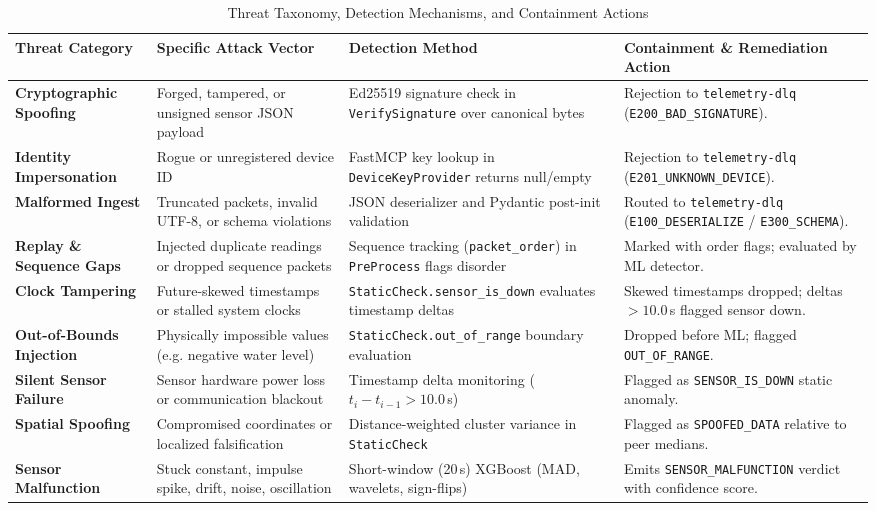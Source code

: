 \documentclass[11pt,a4paper]{article}
\begin{document}
\begin{table}[H]
\centering
\scriptsize
\renewcommand{\arraystretch}{0.98}
\caption{Threat Taxonomy, Detection Mechanisms, and Containment Actions}
\label{tab:threat_table}
\begin{tabularx}{\textwidth}{p{2.2cm}p{3.2cm}p{4.2cm}X}
\toprule
\textbf{Threat Category} & \textbf{Specific Attack Vector} & \textbf{Detection Method} & \textbf{Containment \& Remediation Action} \\
\midrule
\textbf{Cryptographic Spoofing} & Forged, tampered, or unsigned sensor JSON payload & Ed25519 signature check in \texttt{VerifySignature} over canonical bytes & Rejection to \texttt{telemetry-dlq} (\texttt{E200\_BAD\_SIGNATURE}). \\
\textbf{Identity Impersonation} & Rogue or unregistered device ID & FastMCP key lookup in \texttt{DeviceKeyProvider} returns null/empty & Rejection to \texttt{telemetry-dlq} (\texttt{E201\_UNKNOWN\_DEVICE}). \\
\textbf{Malformed Ingest} & Truncated packets, invalid UTF-8, or schema violations & JSON deserializer and Pydantic post-init validation & Routed to \texttt{telemetry-dlq} (\texttt{E100\_DESERIALIZE} / \texttt{E300\_SCHEMA}). \\
\textbf{Replay \& Sequence Gaps} & Injected duplicate readings or dropped sequence packets & Sequence tracking (\texttt{packet\_order}) in \texttt{PreProcess} flags disorder & Marked with order flags; evaluated by ML detector. \\
\textbf{Clock Tampering} & Future-skewed timestamps or stalled system clocks & \texttt{StaticCheck.sensor\_is\_down} evaluates timestamp deltas & Skewed timestamps dropped; deltas $> 10.0$\,s flagged sensor down. \\
\textbf{Out-of-Bounds Injection} & Physically impossible values (e.g. negative water level) & \texttt{StaticCheck.out\_of\_range} boundary evaluation & Dropped before ML; flagged \texttt{OUT\_OF\_RANGE}. \\
\textbf{Silent Sensor Failure} & Sensor hardware power loss or communication blackout & Timestamp delta monitoring ($t_i - t_{i-1} > 10.0$\,s) & Flagged as \texttt{SENSOR\_IS\_DOWN} static anomaly. \\
\textbf{Spatial Spoofing} & Compromised coordinates or localized falsification & Distance-weighted cluster variance in \texttt{StaticCheck} & Flagged as \texttt{SPOOFED\_DATA} relative to peer medians. \\
\textbf{Sensor Malfunction} & Stuck constant, impulse spike, drift, noise, oscillation & Short-window (20\,s) XGBoost (MAD, wavelets, sign-flips) & Emits \texttt{SENSOR\_MALFUNCTION} verdict with confidence score. \\

\end{tabularx}
\end{table}
\end{document}
